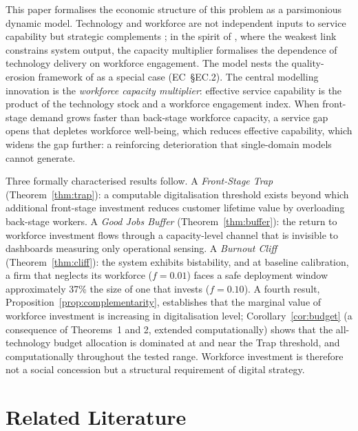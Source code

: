 \documentclass[msom,dblanonrev]{informs4}
\begin{document}
This paper formalises the economic structure of this problem as a parsimonious dynamic model. Technology and workforce are not independent inputs to service capability but strategic complements \citep{milgrom1990economics, bainbridge1983ironies}; in the spirit of \citet{kremer1993oring}, where the weakest link constrains system output, the capacity multiplier formalises the dependence of technology delivery on workforce engagement. The model nests the quality-erosion framework of \citet{oliva2001cutting} as a special case (EC~\S EC.2). The central modelling innovation is the \emph{workforce capacity multiplier}: effective service capability is the product of the technology stock and a workforce engagement index. When front-stage demand grows faster than back-stage workforce capacity, a service gap opens that depletes workforce well-being, which reduces effective capability, which widens the gap further: a reinforcing deterioration that single-domain models cannot generate.

Three formally characterised results follow. A \emph{Front-Stage Trap} (Theorem~\ref{thm:trap}): a computable digitalisation threshold exists beyond which additional front-stage investment reduces customer lifetime value by overloading back-stage workers. A \emph{Good Jobs Buffer} (Theorem~\ref{thm:buffer}): the return to workforce investment flows through a capacity-level channel that is invisible to dashboards measuring only operational sensing. A \emph{Burnout Cliff} (Theorem~\ref{thm:cliff}): the system exhibits bistability, and at baseline calibration, a firm that neglects its workforce ($f{=}0.01$) faces a safe deployment window approximately 37\% the size of one that invests ($f{=}0.10$). A fourth result, Proposition~\ref{prop:complementarity}, establishes that the marginal value of workforce investment is increasing in digitalisation level; Corollary~\ref{cor:budget} (a consequence of Theorems~1 and 2, extended computationally) shows that the all-technology budget allocation is dominated at and near the Trap threshold, and computationally throughout the tested range. Workforce investment is therefore not a social concession but a structural requirement of digital strategy.



\section{Related Literature}\label{sec:lit}
\end{document}
